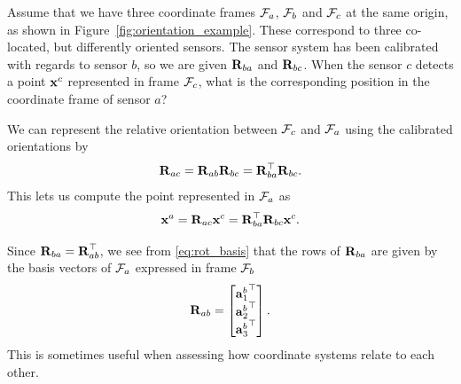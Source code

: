 \begin{example}[frametitle=Transforming detections between sensors]
{
  \centering
  
  \captionsetup{type=figure}
  \label{fig:orientation_example}
  \par
}

Assume that we have three coordinate frames $\mathcal{F}_a$, $\mathcal{F}_b$ and $\mathcal{F}_c$ at the same origin, as shown in Figure~\ref{fig:orientation_example}.
These correspond to three co-located, but differently oriented sensors.
The sensor system has been calibrated with regards to sensor $b$, so we are given ${\boldsymbol{\mathbf{R}}}_{ba}$ and ${\boldsymbol{\mathbf{R}}}_{bc}$.
When the sensor $c$ detects a point ${\boldsymbol{\mathbf{x}}}^c$ represented in frame $\mathcal{F}_c$, what is the corresponding position in the coordinate frame of sensor $a$?

We can represent the relative orientation between $\mathcal{F}_c$ and $\mathcal{F}_a$ using the calibrated orientations by
\begin{equation}
  {\boldsymbol{\mathbf{R}}}_{ac} = {\boldsymbol{\mathbf{R}}}_{ab} {\boldsymbol{\mathbf{R}}}_{bc} = {\boldsymbol{\mathbf{R}}}_{ba}^{\top} {\boldsymbol{\mathbf{R}}}_{bc}.
\end{equation}
This lets us compute the point represented in $\mathcal{F}_a$ as
\begin{equation}
  {\boldsymbol{\mathbf{x}}}^a = {\boldsymbol{\mathbf{R}}}_{ac} {\boldsymbol{\mathbf{x}}}^c = {\boldsymbol{\mathbf{R}}}_{ba}^{\top} {\boldsymbol{\mathbf{R}}}_{bc} {\boldsymbol{\mathbf{x}}}^c.
\end{equation}
\end{example}

Since ${\boldsymbol{\mathbf{R}}}_{ba} = {\boldsymbol{\mathbf{R}}}_{ab}^{\top}$, we see from \eqref{eq:rot_basis} that the rows of ${\boldsymbol{\mathbf{R}}}_{ba}$ are given by the basis vectors of $\mathcal{F}_a$ expressed in frame $\mathcal{F}_b$
\begin{equation} \label{eq:rot_basis_rows}
  {\boldsymbol{\mathbf{R}}}_{ab} = 
  \begin{bmatrix}
    {{\boldsymbol{\mathbf{a}}}^b_1}^{\top}\\
    {{\boldsymbol{\mathbf{a}}}^b_2}^{\top}\\
    {{\boldsymbol{\mathbf{a}}}^b_3}^{\top}
  \end{bmatrix}.
\end{equation}
This is sometimes useful when assessing how coordinate systems relate to each other.

